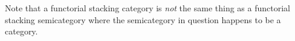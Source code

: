 \begin{remark}
    Note that a functorial stacking category is \emph{not} the same thing as a functorial stacking semicategory where the semicategory in question happens to be a category.
\end{remark}
